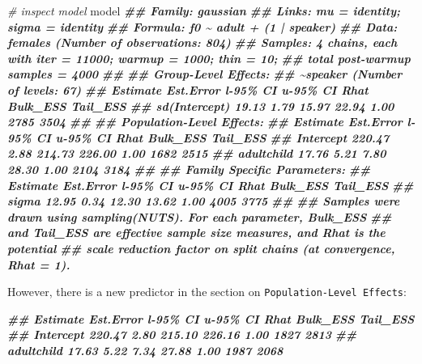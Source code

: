 \documentclass[
]{book}
\newenvironment{Shaded}{\begin{snugshade}}{\end{snugshade}}
\newcommand{\CommentTok}[1]{\textcolor[rgb]{0.56,0.35,0.01}{\textit{#1}}}
\newcommand{\DocumentationTok}[1]{\textcolor[rgb]{0.56,0.35,0.01}{\textbf{\textit{#1}}}}
\newcommand{\NormalTok}[1]{#1}
\begin{document}
\begin{Shaded}
\begin{Highlighting}[]
\CommentTok{\# inspect model}
\NormalTok{model}
\DocumentationTok{\#\#  Family: gaussian }
\DocumentationTok{\#\#   Links: mu = identity; sigma = identity }
\DocumentationTok{\#\# Formula: f0 \textasciitilde{} adult + (1 | speaker) }
\DocumentationTok{\#\#    Data: females (Number of observations: 804) }
\DocumentationTok{\#\# Samples: 4 chains, each with iter = 11000; warmup = 1000; thin = 10;}
\DocumentationTok{\#\#          total post{-}warmup samples = 4000}
\DocumentationTok{\#\# }
\DocumentationTok{\#\# Group{-}Level Effects: }
\DocumentationTok{\#\# \textasciitilde{}speaker (Number of levels: 67) }
\DocumentationTok{\#\#               Estimate Est.Error l{-}95\% CI u{-}95\% CI Rhat Bulk\_ESS Tail\_ESS}
\DocumentationTok{\#\# sd(Intercept)    19.13      1.79    15.97    22.94 1.00     2785     3504}
\DocumentationTok{\#\# }
\DocumentationTok{\#\# Population{-}Level Effects: }
\DocumentationTok{\#\#            Estimate Est.Error l{-}95\% CI u{-}95\% CI Rhat Bulk\_ESS Tail\_ESS}
\DocumentationTok{\#\# Intercept    220.47      2.88   214.73   226.00 1.00     1682     2515}
\DocumentationTok{\#\# adultchild    17.76      5.21     7.80    28.30 1.00     2104     3184}
\DocumentationTok{\#\# }
\DocumentationTok{\#\# Family Specific Parameters: }
\DocumentationTok{\#\#       Estimate Est.Error l{-}95\% CI u{-}95\% CI Rhat Bulk\_ESS Tail\_ESS}
\DocumentationTok{\#\# sigma    12.95      0.34    12.30    13.62 1.00     4005     3775}
\DocumentationTok{\#\# }
\DocumentationTok{\#\# Samples were drawn using sampling(NUTS). For each parameter, Bulk\_ESS}
\DocumentationTok{\#\# and Tail\_ESS are effective sample size measures, and Rhat is the potential}
\DocumentationTok{\#\# scale reduction factor on split chains (at convergence, Rhat = 1).}
\end{Highlighting}
\end{Shaded}

However, there is a new predictor in the section on \texttt{Population-Level\ Effects}:

\begin{Shaded}
\begin{Highlighting}[]
\DocumentationTok{\#\#            Estimate Est.Error l{-}95\% CI u{-}95\% CI Rhat Bulk\_ESS Tail\_ESS}
\DocumentationTok{\#\# Intercept    220.47      2.80   215.10   226.16 1.00     1827     2813}
\DocumentationTok{\#\# adultchild    17.63      5.22     7.34    27.88 1.00     1987     2068}
\end{Highlighting}
\end{Shaded}
\end{document}
